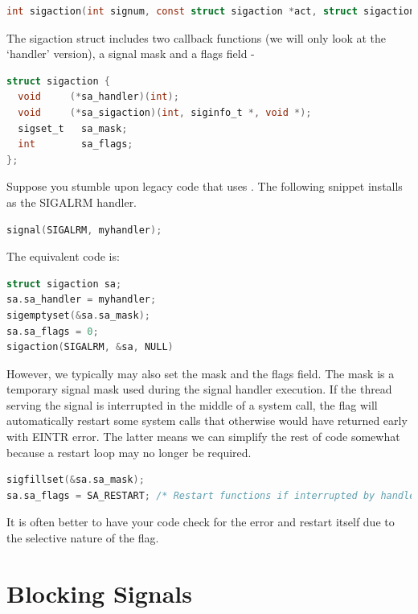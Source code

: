 \begin{lstlisting}[language=C]
int sigaction(int signum, const struct sigaction *act, struct sigaction *oldact);
\end{lstlisting}

The sigaction struct includes two callback functions (we will only look at the `handler' version), a signal mask and a flags field -

\begin{lstlisting}[language=C]
struct sigaction {
  void     (*sa_handler)(int);
  void     (*sa_sigaction)(int, siginfo_t *, void *);
  sigset_t   sa_mask;
  int        sa_flags;
};
\end{lstlisting}

Suppose you stumble upon legacy code that uses .
The following snippet installs  as the SIGALRM handler.

\begin{lstlisting}[language=C]
signal(SIGALRM, myhandler);
\end{lstlisting}

The equivalent  code is:

\begin{lstlisting}[language=C]
struct sigaction sa;
sa.sa_handler = myhandler;
sigemptyset(&sa.sa_mask);
sa.sa_flags = 0;
sigaction(SIGALRM, &sa, NULL)
\end{lstlisting}

However, we typically may also set the mask and the flags field.
The mask is a temporary signal mask used during the signal handler execution.
If the thread serving the signal is interrupted in the middle of a system call, the  flag will automatically restart some system calls that otherwise would have returned early with EINTR error.
The latter means we can simplify the rest of code somewhat because a restart loop may no longer be required.

\begin{lstlisting}[language=C]
sigfillset(&sa.sa_mask);
sa.sa_flags = SA_RESTART; /* Restart functions if interrupted by handler */
\end{lstlisting}

It is often better to have your code check for the error and restart itself due to the selective nature of the flag.

\section{Blocking Signals}

